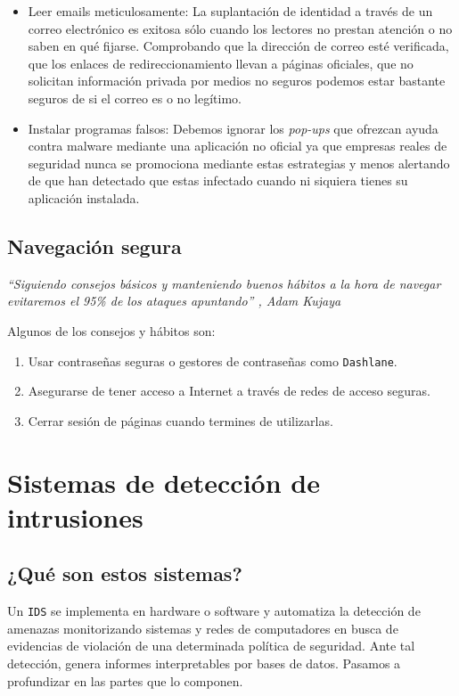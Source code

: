 \documentclass[12pt]{article}
\newcommand{\newpar} {
    \vskip 0.5cm
}
\begin{document}
            \begin{itemize}
                \item Leer emails meticulosamente: La suplantación de identidad a través de un correo electrónico es exitosa sólo cuando los lectores no prestan atención o no saben en qué fijarse. Comprobando que la dirección de correo esté verificada, que los enlaces de redireccionamiento llevan a páginas oficiales, que no solicitan información privada por medios no seguros podemos estar bastante seguros de si el correo es o no legítimo.
                \item Instalar programas falsos: Debemos ignorar los \textit{pop-ups} que ofrezcan ayuda contra malware mediante una aplicación no oficial ya que empresas reales de seguridad nunca se promociona mediante estas estrategias y menos alertando de que han detectado que estas infectado cuando ni siquiera tienes su aplicación instalada.
            \end{itemize}

        \subsection{Navegación segura}
            \textit{“Siguiendo consejos básicos y manteniendo buenos hábitos a la hora de navegar evitaremos el 95\% de los ataques apuntando” , Adam Kujaya}

            \newpar

            Algunos de los consejos y hábitos son:

            \begin{enumerate}
                \item Usar contraseñas seguras o gestores de contraseñas como \texttt{Dashlane}.
                \item Asegurarse de tener acceso a Internet a través de redes de acceso seguras.
                \item Cerrar sesión de páginas cuando termines de utilizarlas.
            \end{enumerate}

    \section{Sistemas de detección de intrusiones}
        \subsection{¿Qué son estos sistemas?}
            Un \texttt{IDS} se implementa en hardware o software y automatiza la detección de amenazas monitorizando sistemas y redes de computadores en busca de evidencias de violación de una determinada política de seguridad. Ante tal detección, genera informes interpretables por bases de datos. Pasamos a profundizar en las partes que lo componen.
\end{document}
